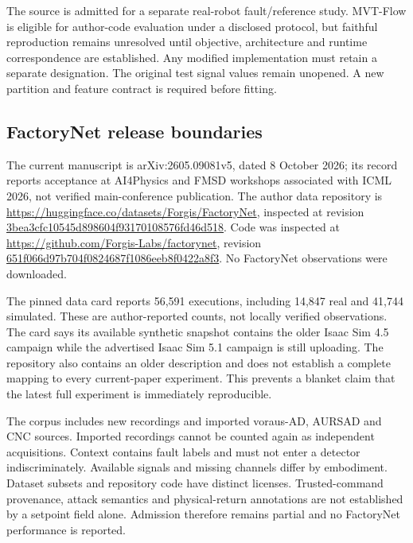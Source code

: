 \documentclass[11pt]{article}
\begin{document}
The source is admitted for a separate real-robot fault/reference study. MVT-Flow is eligible for author-code evaluation under a disclosed protocol, but faithful reproduction remains unresolved until objective, architecture and runtime correspondence are established. Any modified implementation must retain a separate designation. The original test signal values remain unopened. A new partition and feature contract is required before fitting.

\subsection{FactoryNet release boundaries}
The current manuscript is arXiv:2605.09081v5, dated 8 October 2026; its record reports acceptance at AI4Physics and FMSD workshops associated with ICML 2026, not verified main-conference publication. The author data repository is \url{https://huggingface.co/datasets/Forgis/FactoryNet}, inspected at revision \url{3bea3cfc10545d898604f93170108576fd46d518}. Code was inspected at \url{https://github.com/Forgis-Labs/factorynet}, revision \url{651f066d97b704f0824687f1086eeb8f0422a8f3}. No FactoryNet observations were downloaded.

The pinned data card reports 56,591 executions, including 14,847 real and 41,744 simulated. These are author-reported counts, not locally verified observations. The card says its available synthetic snapshot contains the older Isaac Sim 4.5 campaign while the advertised Isaac Sim 5.1 campaign is still uploading. The repository also contains an older description and does not establish a complete mapping to every current-paper experiment. This prevents a blanket claim that the latest full experiment is immediately reproducible.

The corpus includes new recordings and imported voraus-AD, AURSAD and CNC sources. Imported recordings cannot be counted again as independent acquisitions. Context contains fault labels and must not enter a detector indiscriminately. Available signals and missing channels differ by embodiment. Dataset subsets and repository code have distinct licenses. Trusted-command provenance, attack semantics and physical-return annotations are not established by a setpoint field alone. Admission therefore remains partial and no FactoryNet performance is reported.

\clearpage

\end{document}
